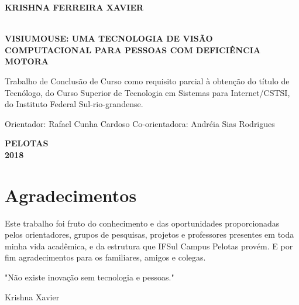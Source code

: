 \begin{titlepage}
\vfill
\begin{center}

    \begin{large} \bfseries KRISHNA FERREIRA XAVIER\end{large}\\[0.4in]
    \vspace{2cm}
    {\large\bfseries{VISIUMOUSE: UMA TECNOLOGIA DE VISÃO COMPUTACIONAL PARA PESSOAS COM DEFICIÊNCIA MOTORA}\\}
    \vspace{1cm}
    \hspace{.45\linewidth}
    \begin{minipage}{.50\linewidth}

Trabalho de Conclusão de Curso como requisito parcial  à obtenção do título de Tecnólogo, do Curso Superior de Tecnologia em Sistemas para Internet/CSTSI, do Instituto Federal Sul-rio-grandense.            

            \vspace{0.5 cm}

            Orientador: Rafael Cunha Cardoso
            Co-orientadora: Andréia Sias Rodrigues
    
    \end{minipage}

    \vspace{2cm}
    \vfill
    \large\bfseries{PELOTAS \\ 2018}
\end{center}

\end{titlepage}

\chapter*{Agradecimentos}
\vspace*{5cm}
Este trabalho foi fruto do conhecimento e das oportunidades proporcionadas pelos orientadores, grupos de pesquisas, projetos e professores presentes em toda minha vida acadêmica, e da estrutura que IFSul Campus Pelotas provém. E por fim agradecimentos para os familiares, amigos e colegas.\\


%
\begin{flushright}
\begin{minipage}[r]{10cm}
\vspace{18cm}
"Não existe inovação sem tecnologia e pessoas."
\begin{flushright}
Krishna Xavier
\end{flushright}
\end{minipage}
\end{flushright}